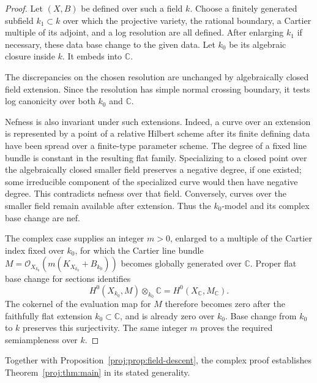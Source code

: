 \documentclass[11pt,letterpaper]{article}
\theoremstyle{definition}
\theoremstyle{remark}
\begin{document}
\begin{proof}
Let \((X,B)\) be defined over such a field \(k\). Choose a finitely
generated subfield \(k_1\subset k\) over which the projective variety,
the rational boundary, a Cartier multiple of its adjoint, and a log
resolution are all defined. After enlarging \(k_1\) if necessary,
these data base change to the given data. Let \(k_0\) be its algebraic
closure inside \(k\). It embeds into \(\mathbb{C}\).

The discrepancies on the chosen resolution are unchanged by
algebraically closed field extension. Since the resolution has simple
normal crossing boundary, it tests log canonicity over both \(k_0\)
and \(\mathbb{C}\).

Nefness is also invariant under such extensions. Indeed, a curve
over an extension is represented by a point of a relative Hilbert
scheme after its finite defining data have been spread over a
finite-type parameter scheme. The degree of a fixed line bundle is
constant in the resulting flat family. Specializing to a closed
point over the algebraically closed smaller field preserves a
negative degree, if one existed; some irreducible component of the
specialized curve would then have negative degree. This contradicts
nefness over that field. Conversely, curves over the smaller field
remain available after extension. Thus the \(k_0\)-model and its
complex base change are nef.

The complex case supplies an integer \(m>0\), enlarged to a multiple
of the Cartier index fixed over \(k_0\), for which the Cartier
line bundle \(M=\mathcal{O}_{X_{k_0}}(m(K_{X_{k_0}}+B_{k_0}))\) becomes
globally generated over \(\mathbb{C}\). Proper flat base change for sections
identifies
\[
 H^0(X_{k_0},M)\otimes_{k_0}\mathbb{C}
   = H^0(X_{\mathbb{C}},M_{\mathbb{C}}).
\]
The cokernel of the evaluation map for \(M\) therefore becomes zero
after the faithfully flat extension \(k_0\subset\mathbb{C}\), and is already
zero over \(k_0\). Base change from \(k_0\) to \(k\) preserves this
surjectivity. The same integer \(m\) proves the required
semiampleness over \(k\).
\end{proof}

Together with Proposition~\ref{proj:prop:field-descent}, the complex proof
establishes Theorem~\ref{proj:thm:main} in its stated generality.

 
{}


\end{document}
